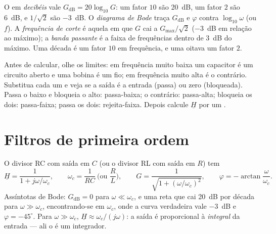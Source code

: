 \begin{definition}\label{def:b1:filters-transfer-functions:bode}
O  em \emph{decibéis} vale $G_{\mathrm{dB}} = 20\log_{10}G$: um fator
$10$ são \qty{20}{dB}, um fator $2$ são \qty{6}{dB}, e $1/\sqrt2$ são
\qty{-3}{dB}. O \emph{diagrama de Bode} traça $G_{\mathrm{dB}}$ e
$\varphi$ contra $\log_{10}\omega$ (ou $f$). A \emph{frequência de
corte} é aquela em que $G$ cai a $G_{\max}/\sqrt2$ (\qty{-3}{dB} em relação
ao máximo); a \emph{banda passante} é a faixa de frequências dentro de
\qty{3}{dB} do máximo. Uma década é um fator $10$ em frequência, e uma
oitava um fator $2$.
\end{definition}

\begin{method}\label{met:b1:filters-transfer-functions:nature}
Antes de calcular, olhe os limites: em frequência muito baixa um capacitor
é um circuito aberto e uma bobina é um fio; em frequência muito alta é o
contrário. Substitua cada um e veja se a saída é a entrada
(passa) ou zero (bloqueada). Passa o baixo e bloqueia o alto: passa-baixa; o
contrário: passa-alta; bloqueia os dois: passa-faixa; passa os dois: rejeita-faixa.
Depois calcule $\underline H$ por um .
\end{method}

\section{Filtros de primeira ordem}

\begin{proposition}\label{prop:b1:filters-transfer-functions:lowpass1}
O divisor RC com saída em $C$ (ou o divisor RL com saída
em $R$) tem
\[
\underline H = \frac{1}{1 + j\omega/\omega_c}, \qquad
\omega_c = \frac{1}{RC} \ \Big(\text{ou } \frac{R}{L}\Big),
\qquad G = \frac{1}{\sqrt{1 + (\omega/\omega_c)^2}}, \qquad
\varphi = -\arctan\frac{\omega}{\omega_c} .
\]
Assíntotas de Bode: $G_{\mathrm{dB}} = 0$ para $\omega \ll \omega_c$, e uma
reta que cai \qty{20}{dB} por década para $\omega \gg \omega_c$,
encontrando-se em $\omega_c$, onde a curva verdadeira vale \qty{-3}{dB} e
$\varphi = -45^\circ$. Para $\omega \gg \omega_c$, $\underline H \approx
\omega_c/(j\omega)$: a saída é proporcional à \emph{integral}
da entrada --- ali o  é um integrador.
\end{proposition}

